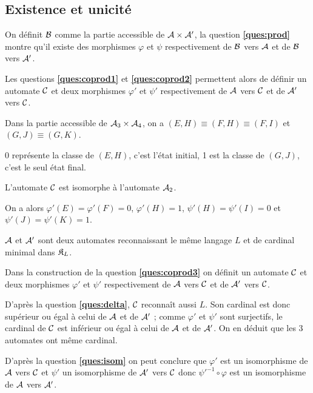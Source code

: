 \subsection{Existence et unicité}
\begin{Exercise}[label=ques:coprod3]
On définit ${\cal B}$ comme la partie accessible de ${\cal A}\times {\cal A}'$, la question {\bf \ref{ques:prod}} montre qu'il existe des morphismes $\varphi$ et $\psi$ respectivement de  ${\cal B}$ vers  ${\cal A}$ et de  ${\cal B}$ vers ${\cal A}'$.

Les questions {\bf \ref{ques:coprod1}} et {\bf \ref{ques:coprod2}} permettent alors de définir un automate ${\cal C}$ et deux morphismes $\varphi'$ et $\psi'$ respectivement de  ${\cal A}$ vers  ${\cal C}$ et de  ${\cal A}'$ vers ${\cal C}$.

\end{Exercise}
\begin{Exercise}
Dans la partie accessible de ${\cal A}_3\times {\cal A}_4$, on a $(E, H) \equiv (F, H) \equiv (F, I)$ et $(G, J) \equiv (G,K)$.

0 représente la classe de $(E, H)$, c'est l'état initial, 1 est la classe de $(G, J)$, c'est le seul état final.

L'automate ${\cal C}$ est isomorphe à l'automate ${\cal A}_2$.

On a alors $\varphi'(E) = \varphi'(F) =0$, $\varphi'(H) = 1$, $\psi'(H)=\psi'(I)=0$ et $\psi'(J)=\psi'(K) = 1$.

\end{Exercise}
\begin{Exercise}
${\cal A}$ et ${\cal A}'$ sont deux automates reconnaissant le même langage $L$ et de cardinal minimal dans ${\frak K}_L$.

Dans la construction de la question {\bf \ref{ques:coprod3}} on définit un automate $\cal C$ et deux morphismes $\varphi'$ et $\psi'$ respectivement de  ${\cal A}$ vers  ${\cal C}$ et de  ${\cal A}'$ vers ${\cal C}$.

D'après la question {\bf \ref{ques:delta}}, ${\cal C}$ reconnaît aussi $L$. Son cardinal est donc supérieur ou égal à celui de ${\cal A}$ et de ${\cal A}'$ ; comme $\varphi'$ et $\psi'$ sont surjectifs, le cardinal de ${\cal C}$ est inférieur ou égal à celui de ${\cal A}$ et de ${\cal A}'$. On en déduit que les 3 automates ont même cardinal.

D'après la question {\bf \ref{ques:isom}} on peut conclure que $\varphi'$ est un isomorphisme de ${\cal A}$ vers ${\cal C}$ et $\psi'$ un isomorphisme de ${\cal A}'$ vers ${\cal C}$ donc $\psi'^{-1}\circ \varphi$ est un isomorphisme de ${\cal A}$ vers ${\cal A}'$.
\end{Exercise}
